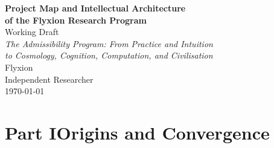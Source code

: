 \documentclass[12pt, twoside]{article}
\begin{document}
\begin{titlepage}
\centering
\vspace*{2cm}
{\Huge\bfseries Project Map and Intellectual Architecture}\\[0.6em]
{\Large\bfseries of the Flyxion Research Program}\\[2em]
{\large Working Draft}\\[0.4em]
{\normalsize\itshape The Admissibility Program: From Practice and Intuition\\
to Cosmology, Cognition, Computation, and Civilisation}\\[3em]
{\large Flyxion}\\[0.5em]
{\normalsize Independent Researcher\\[0.2em]
\today}
\vfill
\begin{abstract}
\noindent
This document maps the intellectual architecture of the Flyxion research
program as it stands at the time of writing. The program spans cosmological
field theory, formal ontology, cognitive architecture, memory theory,
process-native computation, and civilisational geometry. Despite their
apparent diversity, these projects share a common organising principle: the
claim that every domain of inquiry is fundamentally concerned with the
maintenance, loss, restoration, and navigation of \emph{admissible
transformations}. This organising principle is called the Admissibility
Program. The document is organised in three parts. Part~I traces the
origins of the program from direct practical engagement with construction,
repair, and physical restoration through the convergence of core intuitions
into formal frameworks. Part~II presents the current architecture as a
five-layer structure: practice and embodied knowledge, core intuitions,
theoretical frameworks, formalization programs, and domain applications.
Part~III surveys the major open problems whose resolution would most
significantly advance the program. An appendix provides a
framework-by-framework reference guide following a common template.
\end{abstract}
\end{titlepage}

\tableofcontents
\newpage

\part*{Part I\quad Origins and Convergence}
\end{document}
